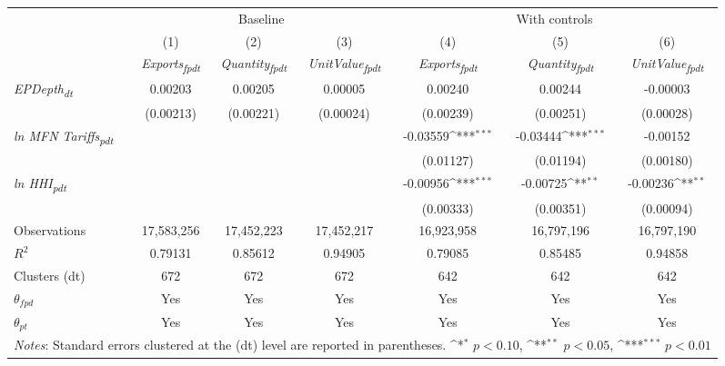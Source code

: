 {
\def\sym#1{\ifmmode^{#1}\else\(^{#1}\)\fi}
\begin{tabular}{l*{6}{c}}
\toprule
&\multicolumn{3}{c}{Baseline}&\multicolumn{3}{c}{With controls}\\\cmidrule(lr){2-4}\cmidrule(lr){5-7}
&(1)&(2)&(3)&(4)&(5)&(6)\\
&\textit{Exports\textsubscript{fpdt}}&\textit{Quantity\textsubscript{fpdt}}&\textit{UnitValue\textsubscript{fpdt}}&\textit{Exports\textsubscript{fpdt}}&\textit{Quantity\textsubscript{fpdt}}&\textit{UnitValue\textsubscript{fpdt}}\\
\midrule
\textit{EPDepth\textsubscript{dt}} & 0.00203 & 0.00205 & 0.00005 & 0.00240 & 0.00244 & -0.00003\\
 & (0.00213) & (0.00221) & (0.00024) & (0.00239) & (0.00251) & (0.00028)\\
\addlinespace
\textit{ln MFN Tariffs\textsubscript{pdt}} &  &  &  & -0.03559\sym{***} & -0.03444\sym{***} & -0.00152\\
 &  &  &  & (0.01127) & (0.01194) & (0.00180)\\
\addlinespace
\textit{ln HHI\textsubscript{pdt}} &  &  &  & -0.00956\sym{***} & -0.00725\sym{**} & -0.00236\sym{**}\\
 &  &  &  & (0.00333) & (0.00351) & (0.00094)\\
\midrule
Observations & 17,583,256 & 17,452,223 & 17,452,217 & 16,923,958 & 16,797,196 & 16,797,190\\
$R^{2}$ & 0.79131 & 0.85612 & 0.94905 & 0.79085 & 0.85485 & 0.94858\\
Clusters (dt) & 672 & 672 & 672 & 642 & 642 & 642\\
$\theta_{fpd}$ & Yes & Yes & Yes & Yes & Yes & Yes\\
$\theta_{pt}$ & Yes & Yes & Yes & Yes & Yes & Yes\\
\bottomrule
\multicolumn{7}{l}{\footnotesize \textit{Notes}: Standard errors clustered at the (dt) level are reported in parentheses. \sym{*} \(p<0.10\), \sym{**} \(p<0.05\), \sym{***} \(p<0.01\)}\\
\end{tabular}
}

